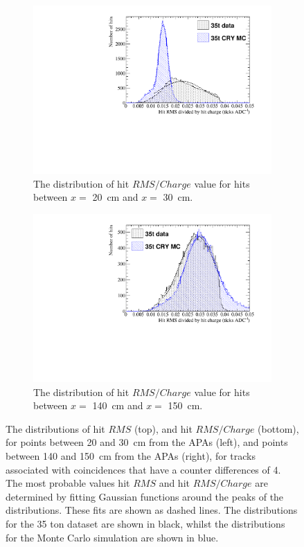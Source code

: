 \begin{figure}
\begin{subfigure}{0.48\textwidth}
    \includegraphics[width=\textwidth]{CombCan_2}
    \caption{The distribution of hit $RMS/Charge$ value for hits between $x =$ 20~cm and $x =$ 30~cm.}
  \end{subfigure}%
  \hspace{0.03\textwidth}%
  \begin{subfigure}{0.48\textwidth}
    \centering
    \includegraphics[width=\textwidth]{CombCan_3}
    \caption{The distribution of hit $RMS/Charge$ value for hits between $x =$ 140~cm and $x =$ 150~cm.}
    \label{fig:DiffMCHitFit_3}
  \end{subfigure}
  \caption[The distributions of hit $RMS$ and $RMS/Charge$ for tracks with a counter difference of 4 in the 35 ton dataset, and a low noise 35 ton detector]
          {The distributions of hit $RMS$ (top), and hit $RMS/Charge$ (bottom), for points between 20 and 30~cm from the APAs (left), and points between 140 and 150~cm from the APAs (right), for tracks associated with coincidences that have a counter differences of 4. The most probable values hit $RMS$ and hit $RMS/Charge$ are determined by fitting Gaussian functions around the peaks of the distributions. These fits are shown as dashed lines. The distributions for the 35 ton dataset are shown in black, whilst the distributions for the Monte Carlo simulation are shown in blue.}
          \label{fig:DiffMCHitFit}
\end{figure}


